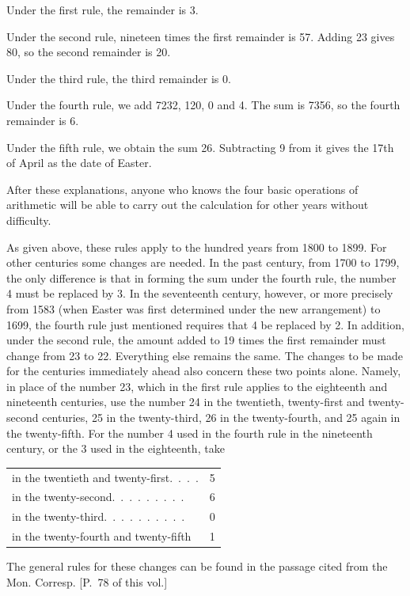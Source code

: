 Under the first rule, the remainder is 3.

Under the second rule, nineteen times the first remainder is 57. Adding 23 gives 80, so the second remainder is 20.

Under the third rule, the third remainder is 0.

Under the fourth rule, we add 7232, 120, 0 and 4. The sum is 7356, so the fourth remainder is 6.

Under the fifth rule, we obtain the sum 26. Subtracting 9 from it gives the 17th of April as the date of Easter.

After these explanations, anyone who knows the four basic operations of arithmetic will be able to carry out the calculation for other years without difficulty.

As given above, these rules apply to the hundred years from 1800 to 1899. For other centuries some changes are needed. In the past century, from 1700 to 1799, the only difference is that in forming the sum under the fourth rule, the number 4 must be replaced by 3. In the seventeenth century, however, or more precisely from 1583 (when Easter was first determined under the new arrangement) to 1699, the fourth rule just mentioned requires that 4 be replaced by 2. In addition, under the second rule, the amount added to 19 times the first remainder must change from 23 to 22. Everything else remains the same. The changes to be made for the centuries immediately ahead also concern these two points alone. Namely, in place of the number 23, which in the %
%
first rule applies to the eighteenth and nineteenth centuries, use the number 24 in the twentieth, twenty-first and twenty-second centuries, 25 in the twenty-third, 26 in the twenty-fourth, and 25 again in the twenty-fifth. For the number 4 used in the fourth rule in the nineteenth century, or the 3 used in the eighteenth, take
\begin{center}\small
\begin{tabular}{lr}
in the twentieth and twenty-first\quad .\ .\ .\ . &5\\
in the twenty-second\quad .\ .\ .\ .\ .\ .\ .\ .\ . &6\\
in the twenty-third\quad .\ .\ .\ .\ .\ .\ .\ .\ .\ . &0\\
in the twenty-fourth and twenty-fifth &1
\end{tabular}
\end{center}
The general rules for these changes can be found in the passage cited from the Mon. Corresp. [P.~78 of this vol.]

